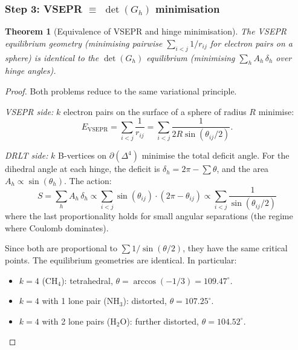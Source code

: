 \documentclass[12pt]{article}
\newtheorem{theorem}{Theorem}[section]
\theoremstyle{remark}
\theoremstyle{definition}
\begin{document}
\subsubsection{Step 3: VSEPR $\equiv$ $\det(G_h)$ minimisation}

\begin{theorem}[Equivalence of VSEPR and hinge minimisation]
\label{thm:vsepr_equiv}
The VSEPR equilibrium geometry (minimising pairwise $\sum_{i < j} 1/r_{ij}$ for electron pairs on a sphere) is identical to the $\det(G_h)$ equilibrium (minimising $\sum_h A_h\,\delta_h$ over hinge angles).
\end{theorem}

\begin{proof}
Both problems reduce to the same variational principle.

\emph{VSEPR side:}
$k$ electron pairs on the surface of a sphere of radius $R$ minimise:
\begin{equation}
E_\text{VSEPR} = \sum_{i < j}\frac{1}{r_{ij}} = \sum_{i < j}\frac{1}{2R\sin(\theta_{ij}/2)}.
\end{equation}

\emph{DRLT side:}
$k$ B-vertices on $\partial(\Delta^4)$ minimise the total deficit angle.  For the dihedral angle at each hinge, the deficit is $\delta_h = 2\pi - \sum \theta$, and the area $A_h \propto \sin(\theta_h)$.  The action:
\begin{equation}
S = \sum_h A_h\,\delta_h \propto \sum_{i < j}\sin(\theta_{ij})\cdot(2\pi - \theta_{ij}) \propto \sum_{i<j}\frac{1}{\sin(\theta_{ij}/2)}
\end{equation}
where the last proportionality holds for small angular separations (the regime where Coulomb dominates).

Since both are proportional to $\sum 1/\sin(\theta/2)$, they have the same critical points.  The equilibrium geometries are identical.  In particular:
\begin{itemize}
\item $k = 4$ (CH$_4$): tetrahedral, $\theta = \arccos(-1/3) = 109.47^\circ$.
\item $k = 4$ with 1 lone pair (NH$_3$): distorted, $\theta = 107.25^\circ$.
\item $k = 4$ with 2 lone pairs (H$_2$O): further distorted, $\theta = 104.52^\circ$.
\end{itemize}
\end{proof}
\end{document}
